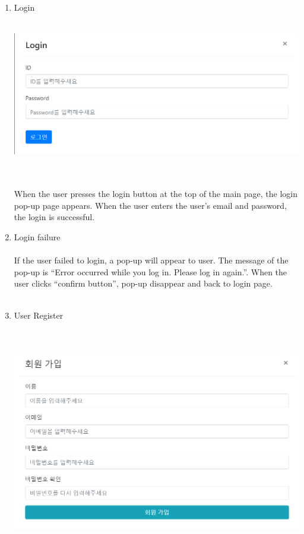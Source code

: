 \documentclass[conference]{IEEEtran}
\begin{document}
\begin{enumerate}
\item{Login}
\\\\\centerline{\includegraphics[scale=0.4]{pics/login.png}}
\\\\When the user presses the login button at the top of the main page, the login pop-up page appears. When the user enters the user's email and password, the login is successful.\\
\item{Login failure}\\
\\If the user failed to login, a pop-up will appear to user. The message of the pop-up is “Error occurred while you log in. Please log in again.”. When the user clicks “confirm button”, pop-up disappear and back to login page.\\\\
\item{User Register}\\\\
\\\centerline{\includegraphics[scale=0.4]{pics/register.png}}\\

\end{enumerate}
\end{document}
